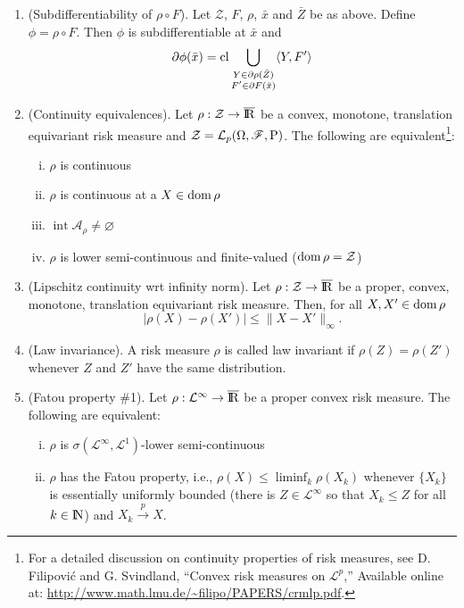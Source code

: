 \documentclass[a4paper,10pt]{article}
\begin{document}
\begin{enumerate}
 \item (Subdifferentiability of $\rho\circ F$). Let $\mathcal{Z}$, $F$, $\rho$, $\bar{x}$ and $\bar{Z}$ be as above.
       Define $\phi = \rho\circ F$. 
       Then $\phi$ is subdifferentiable at $\bar{x}$ and 
       \[
        \partial \phi(\bar{x}) = \operatorname{cl} 
        \bigcup_{\substack{Y\in \partial \rho(\bar{Z})\\F'\in \partial F(\bar{x})}}\langle Y, F'\rangle
       \]
       
 \item (Continuity equivalences). Let $\rho:\mathcal{Z}\to\barre$ be a convex, monotone, translation
       equivariant risk measure and $\mathcal{Z}=\mathcal{L}_p(\Omega,\mathscr{F},\mathrm{P})$. 
       The following are equivalent\footnote{%
       For a detailed discussion on continuity properties of risk measures, see D. Filipovi{\'c} 
       and G. Svindland, ``Convex risk measures on $\mathcal{L}^p$,''
       Available online at: \url{http://www.math.lmu.de/~filipo/PAPERS/crmlp.pdf}.}:
       \begin{enumerate}[i.]
        \item $\rho$ is continuous
        \item $\rho$ is continuous at a $X\in\operatorname{dom} \rho$
        \item $\operatorname{int} \mathcal{A}_\rho \neq \varnothing$
        \item $\rho$ is lower semi-continuous and finite-valued ($\operatorname{dom} \rho = \mathcal{Z}$)
       \end{enumerate}

 
 \item (Lipschitz continuity wrt infinity norm). Let $\rho:\mathcal{Z}\to\barre$ be a proper, 
       convex, monotone, translation equivariant risk measure. Then, for all $X,X'\in\operatorname{dom}\rho$
       \[
        \left|\rho(X)-\rho(X')\right| \leq \|X-X'\|_{\infty}.
       \]


 \item (Law invariance). A risk measure $\rho$ is called law invariant if $\rho(Z) = \rho(Z')$ whenever 
       $Z$ and $Z'$ have the same distribution.
       
 \item (Fatou property \#1). Let $\rho:\mathcal{L}^\infty\to \barre$ be a proper convex risk measure. 
       The following are equivalent:
       \begin{enumerate}[i.]
        \item $\rho$ is $\sigma(\mathcal{L}^\infty, \mathcal{L}^1)$-lower semi-continuous
        \item $\rho$ has the Fatou property, i.e., $\rho(X) \leq \liminf_{k}\rho(X_k)$ whenever
              $\{X_k\}$ is essentially uniformly bounded (there is $Z\in\mathcal{L}^\infty$ so that $X_k\leq Z$ for all $k\in\N$)
              and $X_k\overset{p}{\longrightarrow}X$.
       \end{enumerate}


\end{enumerate}
\end{document}
